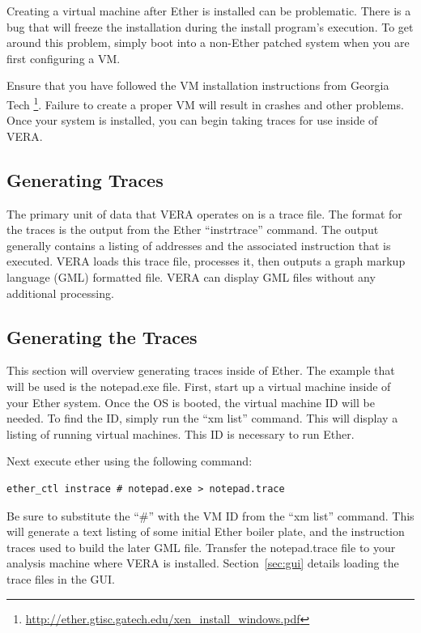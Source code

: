 \documentclass[11pt]{article}
\begin{document}
Creating a virtual machine after Ether is installed can be
problematic. There is a bug that will freeze the installation during
the install program's execution. To get around this problem, simply
boot into a non-Ether patched system when you are first configuring a
VM.

Ensure that you have followed the VM installation instructions from
Georgia Tech
\footnote{\url{http://ether.gtisc.gatech.edu/xen_install_windows.pdf}}.
Failure to create a proper VM will result in crashes and other
problems. Once your system is installed, you can begin taking traces for use
inside of VERA. 

\subsection{Generating Traces}

The primary unit of data that VERA operates on is a trace file. The
format for the traces is the output from the Ether
``instrtrace'' command. The output generally
contains a listing of addresses and the associated instruction that is
executed. VERA loads this trace file, processes it, then outputs a
graph markup language (GML) formatted file. VERA can display GML files
without any additional processing.

\subsection{Generating the Traces}
This section will overview generating traces inside of Ether. The
example that will be used is the notepad.exe file. First, start up a
virtual machine inside of your Ether system. Once the OS is booted,
the virtual machine ID will be needed. To find the ID, simply run the
``xm list'' command. This will display a listing of running virtual
machines. This ID is necessary to run Ether.

Next execute ether using the following command:

\begin{verbatim}ether_ctl instrace # notepad.exe > notepad.trace\end{verbatim}

Be sure to substitute the ``\#'' with the VM ID from the ``xm list''
command. This will generate a text listing of some initial Ether boiler plate,
and the instruction traces used to build the later GML file. Transfer
the notepad.trace file to your analysis machine where VERA is
installed. Section~\ref{sec:gui} details loading the trace files in
the GUI.
\end{document}

